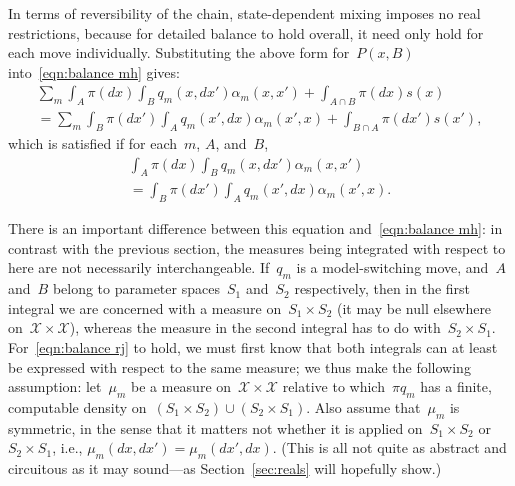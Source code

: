 \documentclass[11pt,a4paper]{article}
\newcommand\mc[1]{\mathcal{#1}}                  %
\theoremstyle{definition}
\begin{document}
In terms of reversibility of the chain, state-dependent mixing imposes no real
restrictions, because for detailed balance to hold overall, it need only hold
for each move individually. Substituting the above form for~$P(x,B)$
into~\eqref{eqn:balance mh} gives:
\begin{multline*}
  \sum_m \int_A \pi(dx) \int_B q_m(x,dx')\alpha_m(x,x')
    + \int_{A\cap B} \pi(dx)s(x) \\
  = \sum_m \int_B \pi(dx') \int_A q_m(x',dx)\alpha_m(x',x)
    + \int_{B\cap A} \pi(dx')s(x'),
\end{multline*}
which is satisfied if for each~$m$, $A$, and~$B$,
\begin{equation}\label{eqn:balance rj}
\begin{multlined}
  \int_A \pi(dx) \int_B q_m(x,dx')\alpha_m(x,x') \\
  = \int_B \pi(dx') \int_A q_m(x',dx)\alpha_m(x',x).
\end{multlined}
\end{equation}

There is an important difference between this equation and~\eqref{eqn:balance
mh}: in contrast with the previous section, the measures being integrated with
respect to here are not necessarily interchangeable. If~$q_m$ is a
model-switching move, and~$A$ and~$B$ belong to parameter spaces~$S_1$ and~$S_2$
respectively, then in the first integral we are concerned with a measure
on~$S_1\times S_2$ (it may be null elsewhere on~$\mc{X}\times\mc{X}$), whereas
the measure in the second integral has to do with~$S_2\times S_1$.
For~\eqref{eqn:balance rj} to hold, we must first know that both integrals can
at least be expressed with respect to the same measure; we thus make the
following assumption: let~$\mu_m$ be a measure on~$\mc{X}\times\mc{X}$ relative
to which~$\pi q_m$ has a finite, computable density on~$(S_1\times S_2) \cup
(S_2\times S_1)$. Also assume that~$\mu_m$ is symmetric, in the sense that it
matters not whether it is applied on~$S_1\times S_2$ or~$S_2\times S_1$, i.e.,
$\mu_m(dx,dx') = \mu_m(dx',dx)$. (This is all not quite as abstract and
circuitous as it may sound---as Section~\ref{sec:reals} will hopefully show.)
\end{document}
